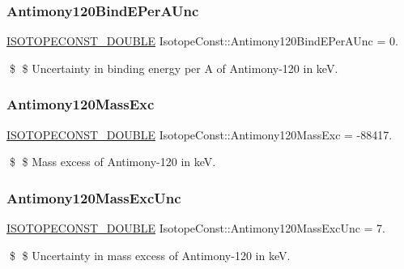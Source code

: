 \subsubsection{\texorpdfstring{Antimony120\+Bind\+E\+Per\+A\+Unc}{Antimony120BindEPerAUnc}}
{\footnotesize\ttfamily \mbox{\hyperlink{group___isotope_const-_macros_ga8f45a7272ce02c0b4c65c44636ed719a}{I\+S\+O\+T\+O\+P\+E\+C\+O\+N\+S\+T\+\_\+\+D\+O\+U\+B\+LE}} Isotope\+Const\+::\+Antimony120\+Bind\+E\+Per\+A\+Unc = 0.}

\$ \$ Uncertainty in binding energy per A of Antimony-\/120 in keV. \mbox{\label{group___isotope_const-_antimony-_sb120_ga51849284abdada7bb97c0b6f8296eb59}} 
\subsubsection{\texorpdfstring{Antimony120\+Mass\+Exc}{Antimony120MassExc}}
{\footnotesize\ttfamily \mbox{\hyperlink{group___isotope_const-_macros_ga8f45a7272ce02c0b4c65c44636ed719a}{I\+S\+O\+T\+O\+P\+E\+C\+O\+N\+S\+T\+\_\+\+D\+O\+U\+B\+LE}} Isotope\+Const\+::\+Antimony120\+Mass\+Exc = -\/88417.}

\$ \$ Mass excess of Antimony-\/120 in keV. \mbox{\label{group___isotope_const-_antimony-_sb120_ga8e4743ba410dae6839afdc1e0e1ac43e}} 
\subsubsection{\texorpdfstring{Antimony120\+Mass\+Exc\+Unc}{Antimony120MassExcUnc}}
{\footnotesize\ttfamily \mbox{\hyperlink{group___isotope_const-_macros_ga8f45a7272ce02c0b4c65c44636ed719a}{I\+S\+O\+T\+O\+P\+E\+C\+O\+N\+S\+T\+\_\+\+D\+O\+U\+B\+LE}} Isotope\+Const\+::\+Antimony120\+Mass\+Exc\+Unc = 7.}

\$ \$ Uncertainty in mass excess of Antimony-\/120 in keV. \mbox{\label{group___isotope_const-_antimony-_sb120_ga2a269b95aa762bdb4645e01d81562470}} 
